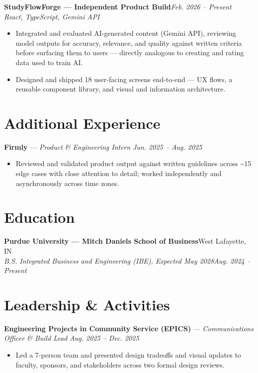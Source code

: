 \documentclass[10pt,letterpaper]{article}
\begin{document}
\textbf{StudyFlowForge --- Independent Product Build}\hfill \textit{Feb. 2026 -- Present}\\[1pt]
\textit{React, TypeScript, Gemini API}
\begin{itemize}
  \item Integrated and evaluated AI-generated content (Gemini API), reviewing model outputs for accuracy, relevance, and quality against written criteria before surfacing them to users --- directly analogous to creating and rating data used to train AI.
  \item Designed and shipped 18 user-facing screens end-to-end --- UX flows, a reusable component library, and visual and information architecture.
\end{itemize}

\section*{Additional Experience}
\textbf{Firmly} --- \textit{Product \& Engineering Intern} \hfill \textit{Jun. 2025 -- Aug. 2025}
\begin{itemize}
  \item Reviewed and validated product output against written guidelines across \textasciitilde15 edge cases with close attention to detail; worked independently and asynchronously across time zones.
\end{itemize}

\section*{Education}
\textbf{Purdue University --- Mitch Daniels School of Business}\hfill West Lafayette, IN\\[1pt]
\textit{B.S. Integrated Business and Engineering (IBE), Expected May 2028}\hfill \textit{Aug. 2024 -- Present}

\section*{Leadership \& Activities}
\textbf{Engineering Projects in Community Service (EPICS)} --- \textit{Communications Officer \& Build Lead} \hfill \textit{Aug. 2025 -- Dec. 2025}
\begin{itemize}
  \item Led a 7-person team and presented design tradeoffs and visual updates to faculty, sponsors, and stakeholders across two formal design reviews.
\end{itemize}
\end{document}
